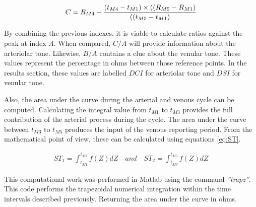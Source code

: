 \begin{align}
	\label{eq:C}
	C = R_{M4} - \frac{(t_{M4}-t_{M1}) \times ((R_{M5}-R_{M1})}{((t_{M5}-t_{M1})} \tagaddtext{[\si{\ohm}]}
\end{align}

By combining the previous indexes, it is viable to calculate ratios against the peak at index $A$. When compared,  $C/A$ will provide information about the arteriolar tone. Likewise, $B/A$ contains a clue about the venular tone. These values represent the percentage in ohms between those reference points. In the results section, these values are labelled $DCI$ for arteriolar tone and $DSI$ for venular tone.


Also, the area under the curve during the arterial and venous cycle can be computed. Calculating the integral value from $t_{M1}$ to $t_{M3}$ provides the full contribution of the arterial process during the cycle. The area under the curve between $t_{M3}$ to $t_{M5}$ produces the input of the venous reporting period. From the mathematical point of view, these can be calculated using equations \ref{eq:ST}.

\begin{align}
	\label{eq:ST}
	ST_1 = \int_{t_{M1}}^{t_{M2}} f(Z) dZ \quad and \quad ST_2 = \int_{t_{M3}}^{t_{M5}} f(Z) dZ 
\end{align}

This computational work was performed in Matlab using the command \textit{''trapz''}. This code performs the trapezoidal numerical integration within the time intervals described previously. Returning the area under the curve in ohms.



\nomenclature[g-p]{$\pi$}{ $\simeq 3.14\ldots$}  

